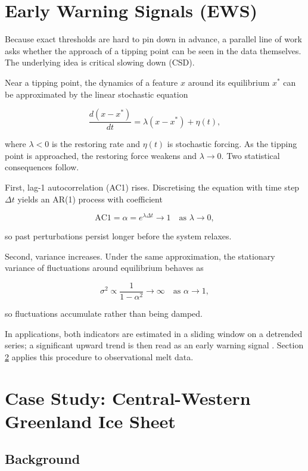 \documentclass[
]{krantz}
\begin{document}
\section{Early Warning Signals (EWS)}\label{tp-ews}

Because exact thresholds are hard to pin down in advance, a parallel line
of work asks whether the approach of a tipping point can be seen in the
data themselves. The underlying idea is critical slowing down (CSD).

Near a tipping point, the dynamics of a feature \(x\) around its equilibrium
\(x^*\) can be approximated by the linear stochastic equation

\[
\frac{d(x - x^*)}{dt} = \lambda (x - x^*) + \eta(t),
\]

where \(\lambda < 0\) is the restoring rate and \(\eta(t)\) is stochastic
forcing. As the tipping point is approached, the restoring force weakens
and \(\lambda \to 0\). Two statistical consequences follow.

First, lag-1 autocorrelation (AC1) rises. Discretising the equation with
time step \(\Delta t\) yields an AR(1) process with coefficient

\[
\text{AC1} = \alpha = e^{\lambda \Delta t} \longrightarrow 1 \quad \text{as } \lambda \to 0,
\]

so past perturbations persist longer before the system relaxes.

Second, variance increases. Under the same approximation, the stationary
variance of fluctuations around equilibrium behaves as

\[
\sigma^2 \propto \frac{1}{1-\alpha^2} \longrightarrow \infty \quad \text{as } \alpha \to 1,
\]

so fluctuations accumulate rather than being damped.

In applications, both indicators are estimated in a sliding window on a
detrended series; a significant upward trend is then read as an early
warning signal \citep{rietkerk2025}. Section \ref{tp-case} applies this
procedure to observational melt data.

\section{Case Study: Central-Western Greenland Ice Sheet}\label{tp-case}

\subsection{Background}\label{background}
\end{document}
